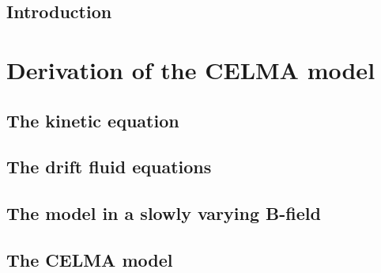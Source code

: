 \documentclass[12pt,a4paper,oneside,openright]{report} %
\title{\thesisTitle}
\author{\authorName}
\date{\thesisDate}
\begin{document}
%
\cleardoublepage
\clearpage



\cleardoublepage
\clearpage
{} %


\cleardoublepage
\clearpage
{} %

\setcounter{page}{4}

\cleardoublepage
\clearpage

\setcounter{page}{5}
\tableofcontents

\cleardoublepage
\clearpage


\chapter{Introduction}
\label{chap:intro}


\part{Derivation of the CELMA model}
\label{part:CELMA}
\chapter{The kinetic equation}
\label{chap:kin}


\chapter{The drift fluid equations}
\label{chap:drift-order}


\chapter{The model in a slowly varying B-field}
\label{chap:slowB}


\chapter{The CELMA model}
\label{chap:CELMA}





\end{document}
